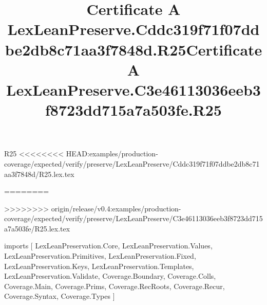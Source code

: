 \begin{lexlean}{R25}
<<<<<<<< HEAD:examples/production-coverage/expected/verify/preserve/LexLeanPreserve/Cddc319f71f07ddbe2db8c71aa3f7848d/R25.lex.tex
\title{Certificate A LexLeanPreserve.Cddc319f71f07ddbe2db8c71aa3f7848d.R25}
========
\title{Certificate A LexLeanPreserve.C3e46113036eeb3f8723dd715a7a503fe.R25}
>>>>>>>> origin/release/v0.4:examples/production-coverage/expected/verify/preserve/LexLeanPreserve/C3e46113036eeb3f8723dd715a7a503fe/R25.lex.tex
\begin{coremodule}
imports [
  LexLeanPreservation.Core,
  LexLeanPreservation.Values,
  LexLeanPreservation.Primitives,
  LexLeanPreservation.Fixed,
  LexLeanPreservation.Keys,
  LexLeanPreservation.Templates,
  LexLeanPreservation.Validate,
  Coverage.Boundary,
  Coverage.Colls,
  Coverage.Main,
  Coverage.Prims,
  Coverage.RecRoots,
  Coverage.Recur,
  Coverage.Syntax,
  Coverage.Types
]


\end{coremodule}
\end{lexlean}
